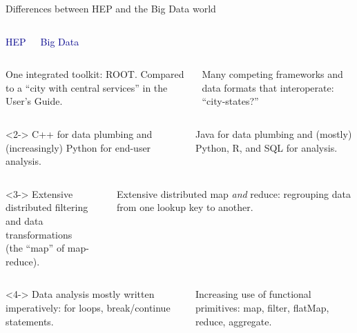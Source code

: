 \documentclass{beamer}
\begin{document}
\begin{frame}{Differences between HEP and the Big Data world}
\begin{columns}
\centering \textcolor{darkblue}{HEP}

\centering \textcolor{darkblue}{Big Data}
\end{columns}

\vfill
\begin{columns}
One integrated toolkit: ROOT. Compared to a ``city with central services'' in the User's Guide.

Many competing frameworks and data formats that interoperate: ``city-states?''
\end{columns}

\vfill
{}

\vfill
\begin{columns}<2->
C++ for data plumbing and (increasingly) Python for end-user analysis.

Java for data plumbing and (mostly) Python, R, and SQL for analysis.
\end{columns}

\vfill
{}

\vfill
\begin{columns}<3->
Extensive distributed filtering \\ and data transformations \\ (the ``map'' of map-reduce).

Extensive distributed map {\it and} reduce: regrouping data from one lookup key to another.
\end{columns}

\vfill
{}

\vfill
\begin{columns}<4->
Data analysis mostly written imperatively: for loops, break/continue statements.

Increasing use of functional primitives: map, filter, flatMap, reduce, aggregate.
\end{columns}
\end{frame}
\end{document}

